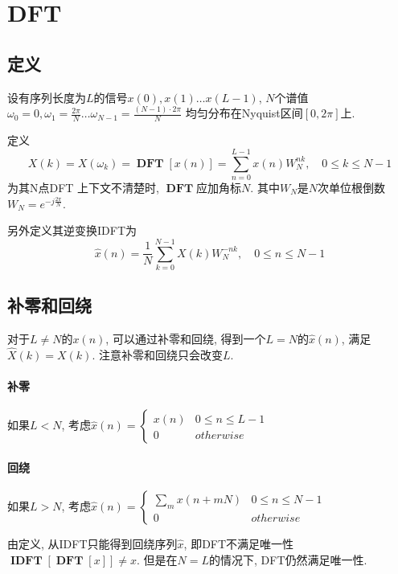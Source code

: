 \documentclass{ctexart}
\DeclareMathOperator{\DFT}{\mathbf{DFT}}
\DeclareMathOperator{\IDFT}{\mathbf{IDFT}}
\begin{document}
\section{DFT}
\subsection{定义}
    设有序列长度为$L$的信号$x(0), x(1) \ldots x(L - 1)$,
    $N$个谱值$\omega_0 = 0, \omega_1 = \frac{2\pi}{N} \ldots \omega_{N - 1} = \frac{(N-1) \cdot 2\pi}{N}$
        均匀分布在Nyquist区间$[0, 2\pi]$上.\par
    定义\[
        X(k) = X(\omega_k) = \DFT[x(n)] = \sum_{n = 0}^{L - 1} x(n) W_N^{nk},\quad 0 \le k \le N - 1\]
    为其N点DFT
    上下文不清楚时, $\DFT$应加角标$N$. 其中$W_N$是$N$次单位根倒数$W_N = e^{- j \frac{2 \pi}{N}}$.\par
    另外定义其逆变换IDFT为\[
        \hat{x}(n) = \frac{1}{N} \sum_{k = 0}^{N - 1} X(k) W_N^{-nk},\quad 0 \le n  \le N -1 \]

\subsection{补零和回绕} 对于$L \neq N$的$x(n)$, 可以通过补零和回绕, 得到一个$L = N$的$\hat{x}(n)$, 满足$\hat{X}(k) = X(k)$.
    注意补零和回绕只会改变$L$.
\paragraph{补零} 如果$L < N$, 考虑$\hat{x}(n) = \begin{cases} x(n) & 0 \le n \le L - 1\\ 0 & otherwise \end{cases}$
\paragraph{回绕} 如果$L > N$, 考虑$\hat{x}(n) = \begin{cases} \sum_m x(n + mN) & 0 \le n \le N - 1 \\ 0 & otherwise \end{cases}$\par
    由定义, 从IDFT只能得到回绕序列$\hat{x}$, 即DFT不满足唯一性 $\IDFT[\DFT [x]] \neq x$. 但是在$N = L$的情况下, DFT仍然满足唯一性.
\end{document}
